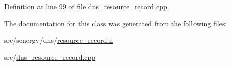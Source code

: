 Definition at line 99 of file dns\-\_\-resource\-\_\-record.\-cpp.



The documentation for this class was generated from the following files\-:\begin{DoxyCompactItemize}
\item 
src/senergy/dns/\hyperlink{resource__record_8h}{resource\-\_\-record.\-h}\item 
src/\hyperlink{dns__resource__record_8cpp}{dns\-\_\-resource\-\_\-record.\-cpp}\end{DoxyCompactItemize}
